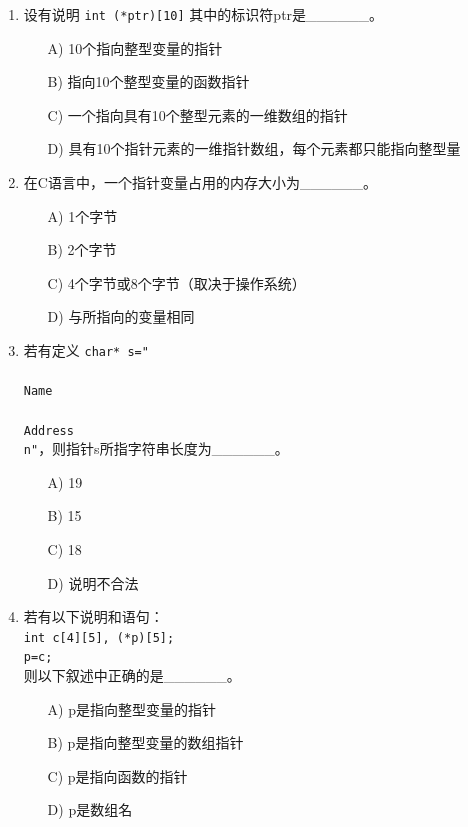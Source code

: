 \documentclass[a4paper,12pt]{article}
\begin{document}
\begin{enumerate}
	\item 设有说明 \texttt{int (*ptr)[10]} 其中的标识符ptr是\_\_\_\_\_\_。
	      \begin{enumerate}
		      \item[A)] 10个指向整型变量的指针
		      \item[B)] 指向10个整型变量的函数指针
		      \item[C)] 一个指向具有10个整型元素的一维数组的指针
		      \item[D)] 具有10个指针元素的一维指针数组，每个元素都只能指向整型量
	      \end{enumerate}
	      \vspace{0.3cm}

	\item 在C语言中，一个指针变量占用的内存大小为\_\_\_\_\_\_。
	      \begin{enumerate}
		      \item[A)] 1个字节
		      \item[B)] 2个字节
		      \item[C)] 4个字节或8个字节（取决于操作系统）
		      \item[D)] 与所指向的变量相同
	      \end{enumerate}
	      \vspace{0.3cm}

	\item 若有定义 \texttt{char* s="\\\\Name\\\\Address\\n"}，则指针s所指字符串长度为\_\_\_\_\_\_。
	      \begin{enumerate}
		      \item[A)] 19
		      \item[B)] 15
		      \item[C)] 18
		      \item[D)] 说明不合法
	      \end{enumerate}
	      \vspace{0.3cm}

	\item 若有以下说明和语句：\\
	      \texttt{int c[4][5], (*p)[5];}\\
	      \texttt{p=c;}\\
	      则以下叙述中正确的是\_\_\_\_\_\_。
	      \begin{enumerate}
		      \item[A)] p是指向整型变量的指针
		      \item[B)] p是指向整型变量的数组指针
		      \item[C)] p是指向函数的指针
		      \item[D)] p是数组名
	      \end{enumerate}
	      \vspace{0.3cm}


\end{enumerate}
\end{document}

